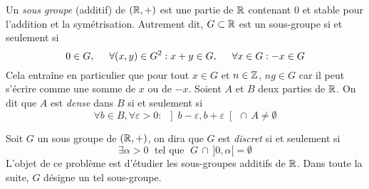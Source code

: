 Un \emph{sous groupe} (additif) de $(\mathbb{R},+)$ est une partie de $\mathbb{R}$ contenant 0 et stable pour l'addition et la sym{\'e}trisation. Autrement dit, $G \subset \mathbb{R}$ est un sous-groupe si et seulement si
\begin{displaymath}
0 \in  G, \hspace{0.5cm}
\forall (x,y) \in G^2 : x+y  \in  G , \hspace{0.5cm}
\forall x \in G : -x  \in  G
\end{displaymath}
Cela entraîne en particulier que pour tout $x\in G$ et $n\in \mathbb{Z}$, $ng\in G$ car il peut s'écrire comme une somme de $x$ ou de $-x$.\newline
Soient $A$ et $B$ deux parties de $\mathbb{R}$. On dit que $A$ est \emph{dense} dans $B$ si et seulement si
\begin{displaymath}
 \forall b\in B, \forall \varepsilon > 0:\; \left] b - \varepsilon, b + \varepsilon \right[ \,\cap\, A \neq \emptyset
\end{displaymath}

Soit $G$ un sous groupe de $(\mathbb{R},+)$, on dira que $G$ est \emph{discret} si et seulement si 
\[ 
\exists \alpha >0 \; \text{ tel que } \;G \,\cap\, ]0,\alpha[ = \emptyset 
\]
L'objet de ce probl{\`e}me est d'{\'e}tudier les sous-groupes additifs de $\mathbb{R}$. Dans toute la suite, $G$ d{\'e}signe un tel sous-groupe.

